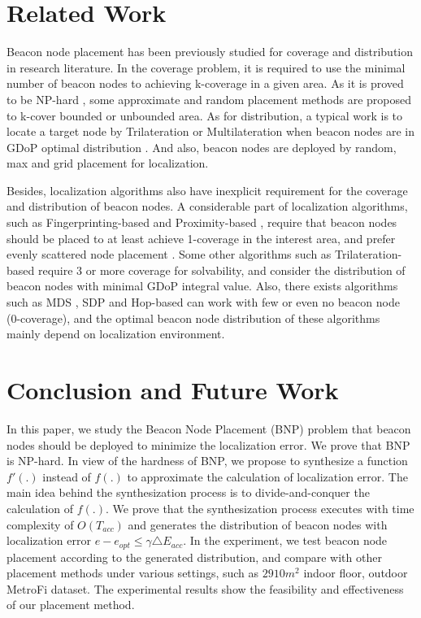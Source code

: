 \documentclass[10pt, conference, letterpaper]{IEEEtran}
\begin{document}
\section{Related Work} \label{related}
Beacon node placement has been previously studied for coverage and distribution in research literature. In the coverage problem, it is required to use the minimal number of beacon nodes to achieving k-coverage in a given area. As it is proved to be NP-hard \cite{CoverageNP03}, some approximate \cite{CERACC12} and random \cite{RKC07} placement methods are proposed to k-cover bounded or unbounded area. As for distribution, a typical work is to locate a target node by Trilateration or Multilateration when beacon nodes are in GDoP optimal distribution \cite{GDoP00}. And also, beacon nodes are deployed by random, max and grid placement \cite{Grid01} for localization.

Besides, localization algorithms also have inexplicit requirement for the coverage and distribution of beacon nodes. A considerable part of localization algorithms, such as Fingerprinting-based \cite{RADAR00}\cite{Fingerprinting04}\cite{Fingerprinting12} and Proximity-based \cite{Proximity08}\cite{Proximity03}, require that beacon nodes should be placed to at least achieve 1-coverage in the interest area, and prefer evenly scattered node placement . Some other algorithms such as Trilateration-based \cite{Trilateration01}\cite{Trilateration04} require 3 or more coverage for solvability, and consider the distribution of beacon nodes with minimal GDoP integral value. Also, there exists algorithms such as MDS \cite{MDS03}\cite{MDS04}, SDP \cite{SDP01} and Hop-based \cite{Hop07}\cite{Hop05}\cite{Hop03} can work with few or even no beacon node (0-coverage), and the optimal beacon node distribution of these algorithms mainly depend on localization environment.

\section{Conclusion and Future Work} \label{conclusion}
In this paper, we study the Beacon Node Placement (BNP) problem that beacon nodes should be deployed to minimize the localization error. We prove that BNP is NP-hard. In view of the hardness of BNP, we propose to synthesize a function $f'(.)$ instead of $f(.)$ to approximate the calculation of localization error. The main idea behind the synthesization process is to divide-and-conquer the calculation of $f(.)$. We prove that the synthesization process executes with time complexity of $O(T_{acc})$ and generates the distribution of beacon nodes with localization error $e-e_{opt} \leq \gamma \triangle E_{acc}$. In the experiment, we test beacon node placement according to the generated distribution, and compare with other placement methods under various settings, such as $2910m^2$ indoor floor, outdoor MetroFi dataset. The experimental results show the feasibility and effectiveness of our placement method.
\end{document}
